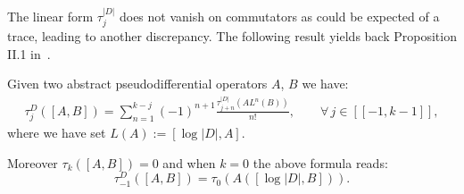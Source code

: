 The linear form $\tau_j^{\vert D\vert}$ does not vanish on commutators as could
be expected of a trace, leading to another discrepancy. The following result yields back  Proposition II.1 in~\cite{CoMo}.

\begin{proposition} Given two abstract pseudodifferential operators $A$, $B$ we have:
\begin{gather}\label{eq:taujDbracket}\tau_j^{D}([A,B])=\sum_{n= 1}^{k-j}
 (-1)^{n+1}\frac{\tau_{j+n}^{\vert D\vert} \left(
    A L^n(B)\right)}{n!},\qquad \forall\,
  j\in[[-1,k-1]],  \end{gather}
where we have set  $L(A):=  [\log \vert D\vert, A].$

Moreover $\tau_k([A,B])=0$ and when $k=0$ the above formula reads:
\[
\tau_{-1}^{D}([A,B ])=\tau_{0}\left( A \left([ \log
    \vert D\vert ,B] \right)\right).
    \]
\end{proposition}

